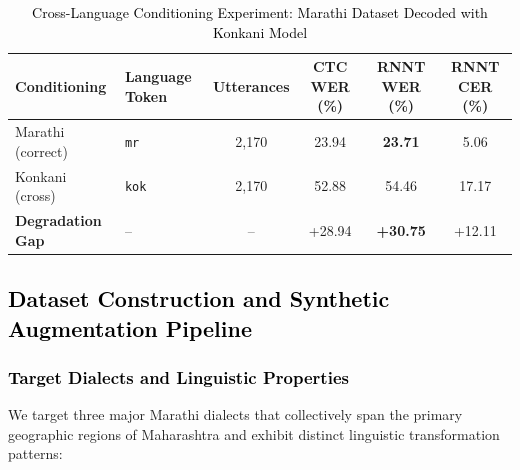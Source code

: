 \begin{table}[t]
\color{black}
\centering
\caption{\textcolor{black}{Cross-Language Conditioning Experiment: Marathi Dataset Decoded with Konkani Model}}
\label{tab:cross_cond}
\begin{tabular}{llcccc}
\hline
\textbf{Conditioning} & \textbf{Language Token} & \textbf{Utterances} & \textbf{CTC WER (\%)} & \textbf{RNNT WER (\%)} & \textbf{RNNT CER (\%)} \\
\hline
Marathi (correct) & \texttt{mr} & 2,170 & 23.94 & \textbf{23.71} & 5.06 \\
Konkani (cross) & \texttt{kok} & 2,170 & 52.88 & 54.46 & 17.17 \\
\hline
\textbf{Degradation Gap} & -- & -- & +28.94 & \textbf{+30.75} & +12.11 \\
\hline
\end{tabular}
\end{table}

\subsection{\textcolor{black}{Dataset Construction and Synthetic Augmentation Pipeline}}

\subsubsection{\textcolor{black}{Target Dialects and Linguistic Properties}}

We target three major Marathi dialects that collectively span the primary geographic regions of Maharashtra and exhibit distinct linguistic transformation patterns:

